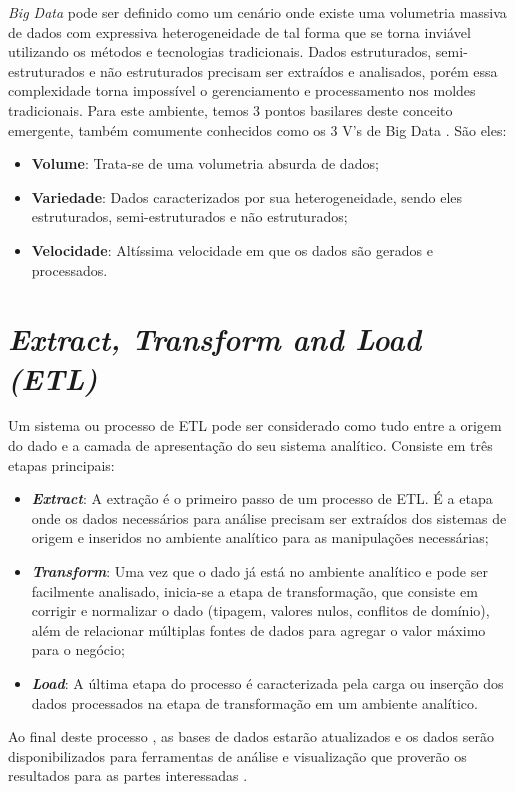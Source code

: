 \textit{Big Data} pode ser definido como um cenário onde existe uma volumetria massiva de dados com expressiva heterogeneidade de tal forma que se torna inviável utilizando os métodos e tecnologias tradicionais. Dados estruturados, semi-estruturados e não estruturados precisam ser extraídos e analisados, porém essa complexidade torna impossível o gerenciamento e processamento nos moldes tradicionais. Para este ambiente, temos 3 pontos basilares deste conceito emergente, também comumente conhecidos como os 3 V's de Big Data \cite{bigdatafastdatadatalake}. São eles:
\begin{itemize} 
 \item \textbf{Volume}: Trata-se de uma volumetria absurda de dados; 
 \item \textbf{Variedade}: Dados caracterizados por sua heterogeneidade, sendo eles estruturados, semi-estruturados e não estruturados;
 \item \textbf{Velocidade}: Altíssima velocidade em que os dados são gerados e processados.
\end{itemize}

\section{\textit{Extract, Transform and Load (ETL)}} Um sistema ou processo de \ac{ETL} pode ser considerado como tudo entre a origem do dado e a camada de apresentação do seu sistema analítico. Consiste em três etapas principais:
\begin{itemize}
\item \textbf{\textit{Extract}}: A extração é o primeiro passo de um processo de ETL. É a etapa onde os dados necessários para análise precisam ser extraídos dos sistemas de origem e inseridos no ambiente analítico para as manipulações necessárias;
\item \textbf{\textit{Transform}}: Uma vez que o dado já está no ambiente analítico e pode ser facilmente analisado, inicia-se a etapa de transformação, que consiste em corrigir e normalizar o dado (tipagem, valores nulos, conflitos de domínio), além de relacionar múltiplas fontes de dados para agregar o valor máximo para o negócio;
\item \textbf{\textit{Load}}: A última etapa do processo é caracterizada pela carga ou inserção dos dados processados na etapa de transformação em um ambiente analítico.
\end{itemize}
Ao final deste processo , as bases de dados estarão atualizados e os dados serão disponibilizados para ferramentas de análise e visualização que proverão os resultados para as partes interessadas \cite{thedatawarehousetoolkit}.

